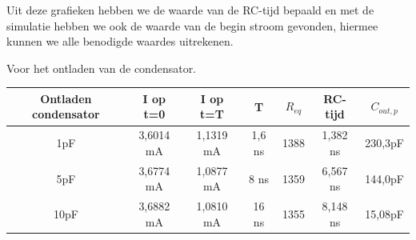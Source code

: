 \documentclass{article}
\begin{document}
Uit deze grafieken hebben we de waarde van de RC-tijd bepaald en met de simulatie hebben we ook de waarde van de begin stroom gevonden, hiermee kunnen we alle benodigde waardes uitrekenen.


\begin{center}

Voor het ontladen van de condensator.

\begin{tabular}{|c |c |c | c| c|c |c|}
	\hline
Ontladen condensator	& I op t=0	& I op t=T 	&  T 		& $R_{eq}$		&RC-tijd 	& $C_{out,p}$ \\
	\hline
1pF 				& 3,6014 mA	& 1,1319 mA	& 1,6 ns	& 1388\Omega	& 1,382 ns	& 230,3pF \\
	\hline
5pF				& 3,6774 mA	& 1,0877 mA	& 8 ns 	& 1359\Omega	& 6,567 ns	& 144,0pF  \\
	\hline
10pF				& 3,6882 mA	& 1,0810 mA	& 16 ns	& 1355\Omega	& 8,148 ns	& 15,08pF \\
	\hline

\end{tabular}
\end{center}
\end{document}
